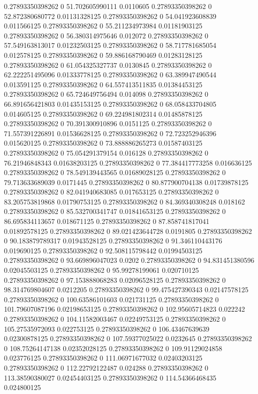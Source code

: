 0.27893350398262 0 51.702605990111 0.0110605
0.27893350398262 0 52.872380680772 0.01131328125
0.27893350398262 0 54.041923608839 0.011566125
0.27893350398262 0 55.211234973984 0.01181903125
0.27893350398262 0 56.380314975646 0.012072
0.27893350398262 0 57.549163813017 0.01232503125
0.27893350398262 0 58.717781685054 0.012578125
0.27893350398262 0 59.886168790469 0.01283128125
0.27893350398262 0 61.054325327737 0.0130845
0.27893350398262 0 62.222251495096 0.01333778125
0.27893350398262 0 63.389947490544 0.013591125
0.27893350398262 0 64.557413511835 0.01384453125
0.27893350398262 0 65.724649756494 0.014098
0.27893350398262 0 66.891656421803 0.01435153125
0.27893350398262 0 68.058433704805 0.014605125
0.27893350398262 0 69.224981802314 0.01485878125
0.27893350398262 0 70.391300910896 0.0151125
0.27893350398262 0 71.557391226891 0.01536628125
0.27893350398262 0 72.723252946396 0.015620125
0.27893350398262 0 73.888886265273 0.01587403125
0.27893350398262 0 75.054291379154 0.016128
0.27893350398262 0 76.21946848343 0.01638203125
0.27893350398262 0 77.384417773258 0.016636125
0.27893350398262 0 78.549139443565 0.01689028125
0.27893350398262 0 79.713633689039 0.0171445
0.27893350398262 0 80.877900704138 0.01739878125
0.27893350398262 0 82.041940683085 0.017653125
0.27893350398262 0 83.205753819868 0.01790753125
0.27893350398262 0 84.369340308248 0.018162
0.27893350398262 0 85.532700341747 0.01841653125
0.27893350398262 0 86.695834113657 0.018671125
0.27893350398262 0 87.858741817041 0.01892578125
0.27893350398262 0 89.021423644728 0.0191805
0.27893350398262 0 90.183879789317 0.01943528125
0.27893350398262 0 91.346110443176 0.019690125
0.27893350398262 0 92.508115798442 0.01994503125
0.27893350398262 0 93.669896047023 0.0202
0.27893350398262 0 94.831451380596 0.02045503125
0.27893350398262 0 95.99278199061 0.020710125
0.27893350398262 0 97.153888068283 0.02096528125
0.27893350398262 0 98.314769804607 0.0212205
0.27893350398262 0 99.475427390343 0.02147578125
0.27893350398262 0 100.63586101603 0.021731125
0.27893350398262 0 101.79607087196 0.02198653125
0.27893350398262 0 102.95605714823 0.022242
0.27893350398262 0 104.11582003467 0.02249753125
0.27893350398262 0 105.27535972093 0.022753125
0.27893350398262 0 106.43467639639 0.02300878125
0.27893350398262 0 107.59377025022 0.0232645
0.27893350398262 0 108.75264147138 0.02352028125
0.27893350398262 0 109.91129024858 0.023776125
0.27893350398262 0 111.06971677032 0.02403203125
0.27893350398262 0 112.22792122487 0.024288
0.27893350398262 0 113.38590380027 0.02454403125
0.27893350398262 0 114.54366468435 0.024800125
